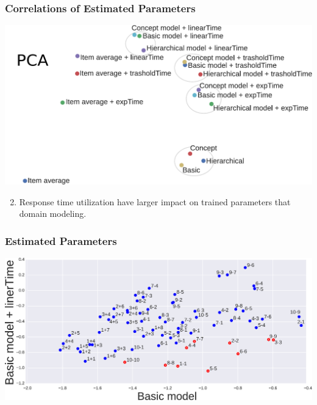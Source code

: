 \documentclass[xcolor=svgnames]{beamer}
\begin{document}
\begin{frame}
    \frametitle{Correlations of Estimated Parameters}
    \includegraphics[width=\linewidth]{figures/pca}
    \begin{enumerate}
        \setcounter{enumi}{1}
        \item Response time utilization have larger impact on trained parameters that domain modeling.
    \end{enumerate}
\end{frame}
\begin{frame}
    \frametitle{Estimated Parameters}
    \includegraphics[width=\linewidth]{figures/difficulties}
\end{frame}
\end{document}
